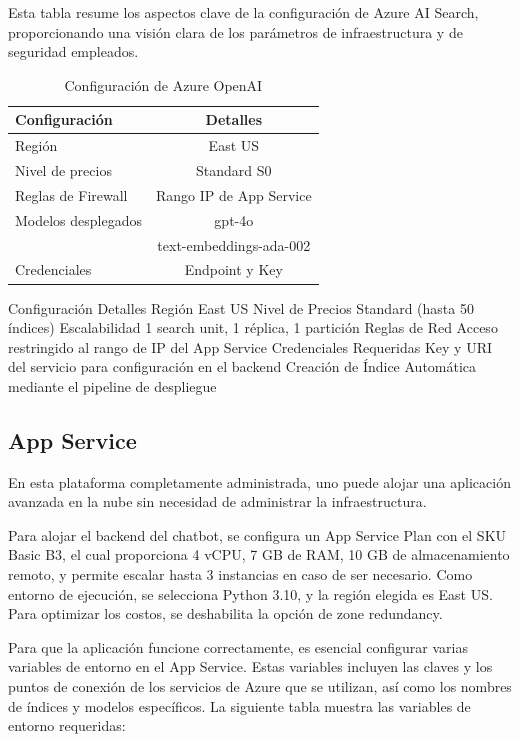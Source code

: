 Esta tabla resume los aspectos clave de la configuración de Azure AI Search, proporcionando una visión clara de los parámetros de infraestructura y de seguridad empleados.

\begin{table}[h]
	\centering
	\caption[Configuración de Azure OpenAI]{Configuración de Azure OpenAI}
	\begin{tabular}{l c}    
		\toprule
		\textbf{Configuración} 	 & \textbf{Detalles} 	\\
		\midrule
		Región              &	East US 				        \\		
		Nivel de precios    & Standard S0				      \\
		Reglas de Firewall  & Rango IP de App Service \\
    Modelos desplegados	& gpt-4o				          \\
            	          & text-embeddings-ada-002	\\
    Credenciales	      & Endpoint y Key 		      \\
		\bottomrule
		\hline
	\end{tabular}
	\label{tab:config-openai}
\end{table}

Configuración	Detalles
Región	East US
Nivel de Precios	Standard (hasta 50 índices)
Escalabilidad	1 search unit, 1 réplica, 1 partición
Reglas de Red	Acceso restringido al rango de IP del App Service
Credenciales Requeridas	Key y URI del servicio para configuración en el backend
Creación de Índice	Automática mediante el pipeline de despliegue

\subsection{App Service}

En esta plataforma completamente administrada, uno puede alojar una aplicación avanzada en la nube sin necesidad de administrar la infraestructura.

Para alojar el backend del chatbot, se configura un App Service Plan con el SKU Basic B3, el cual proporciona 4 vCPU, 7 GB de RAM, 10 GB de almacenamiento remoto, y permite escalar hasta 3 instancias en caso de ser necesario. Como entorno de ejecución, se selecciona Python 3.10, y la región elegida es East US. Para optimizar los costos, se deshabilita la opción de zone redundancy.

Para que la aplicación funcione correctamente, es esencial configurar varias variables de entorno en el App Service. Estas variables incluyen las claves y los puntos de conexión de los servicios de Azure que se utilizan, así como los nombres de índices y modelos específicos. La siguiente tabla muestra las variables de entorno requeridas:

